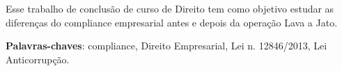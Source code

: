 \setlength{\absparsep}{18pt} %
\begin{resumo}
Esse trabalho de conclusão de curso de Direito tem como objetivo estudar as diferenças do compliance empresarial antes e depois da operação Lava a Jato.

\textbf{Palavras-chaves}: compliance, Direito Empresarial, Lei n. 12846/2013, Lei Anticorrupção.
\end{resumo}